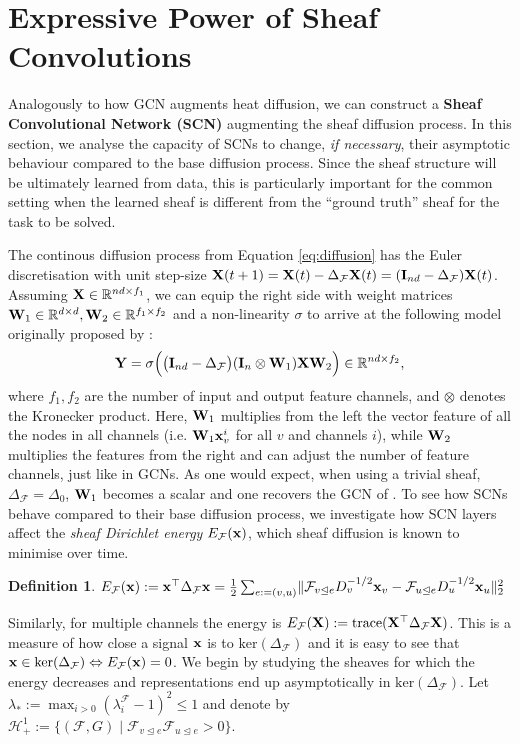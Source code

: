 \documentclass{article}
\newtheorem{definition}[theorem]{Definition}
\def\vx{{\bf{x}}}
\def\mI{{\bf{I}}}
\def\mW{{\bf{W}}}
\def\mX{{\bf{X}}}
\def\mY{{\bf{Y}}}
\def\gF{{\mathcal{F}}}
\def\gH{{\mathcal{H}}}
\def\sR{{\mathbb{R}}}
\newcommand{\tleq}{\trianglelefteq}
\DeclarePairedDelimiter{\norm}{\lVert}{\rVert}
\begin{document}
\section{Expressive Power of Sheaf Convolutions}\label{sec:oversmoothing}

Analogously to how GCN augments heat diffusion, we can construct a \textbf{Sheaf Convolutional Network (SCN)} augmenting the sheaf diffusion process. In this section, we analyse the capacity of SCNs to change, \emph{if necessary}, their asymptotic behaviour compared to the base diffusion process. Since the sheaf structure will be ultimately learned from data, this is particularly important for the common setting when the learned sheaf is different from the ``ground truth'' sheaf for the task to be solved.  

The continous diffusion process from Equation \ref{eq:diffusion} has the Euler discretisation with unit step-size $\mX(t + 1) = \mX(t) - \Delta_\gF \mX(t) = (\mI_{nd} - \Delta_\gF) \mX(t)$.
Assuming $\mX \in \sR^{nd \times f_1}$, we can equip the right side with weight matrices $\mW_1 \in \sR^{d \times d}, \mW_2 \in \sR^{f_1 \times f_2}$ and a non-linearity $\sigma$ to arrive at the following model originally proposed by \citet{hansen2020sheaf}:
\begin{equation}\label{eq:scn}
 \mY = \sigma \Big(\big(\mI_{nd} - \Delta_\gF \big)(\mI_{n} \otimes \mW_1) \mX \mW_2 \Big) \in \sR^{nd \times f_2},
\end{equation}
where $f_1, f_2$ are the number of input and output feature channels, and $\otimes$ denotes the Kronecker product. Here, $\mW_1$ multiplies from the left the vector feature of all the nodes in all channels (i.e. $\mW_1 \vx^i_v$ for all $v$ and channels $i$), while $\mW_2$ multiplies the features from the right and can adjust the number of feature channels, just like in GCNs. As one would expect, when using a trivial sheaf, $\Delta_\gF = \Delta_0$, $\mW_1$ becomes a scalar and one recovers the GCN of \citet{kipf2017graph}. To see how SCNs behave compared to their base diffusion process, we investigate how SCN layers affect the \emph{sheaf Dirichlet energy} $E_\gF(\vx)$, which sheaf diffusion is known to minimise over time. 
\begin{definition}\label{def:energy}
$E_\gF(\vx) :=
\vx^\top \Delta_\gF \vx = \frac{1}{2} \sum_{e:=(v, u)} \norm{\gF_{v \tleq e}D_v^{-1/2}\vx_v - \gF_{u \tleq e}D_u^{-1/2}\vx_u}_2^2 $
\end{definition}
Similarly, for multiple channels the energy is $E_\gF(\mX) := \mathrm{trace}(\mX^\top \Delta_\gF \mX)$. This is a measure of how close a signal $\vx$ is to $\mathrm{ker}(\Delta_\gF)$ and it is easy to see that $\vx \in \mathrm{ker}(\Delta_\gF) \Leftrightarrow E_\gF(\vx) = 0$. We begin by studying the sheaves for which the energy decreases and representations end up asymptotically in $\mathrm{ker}(\Delta_\gF)$. Let $\lambda_* := \max_{i > 0}(\lambda^{\gF}_i - 1)^2 \leq 1$ and denote by $\gH^1_\mathrm{+} := \{ (\gF, G) \mid \gF_{v \tleq e} \gF_{u \tleq e} > 0 \}$.  
\end{document}
